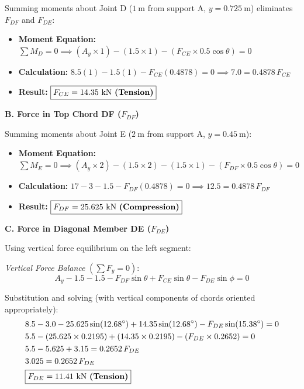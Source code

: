 \documentclass[12pt,a3paper]{article}
\begin{document}
\begin{enumerate}
\begin{tcolorbox}[enhanced,breakable,ansbox,colback=cE!4,colframe=cE,
  boxrule=0.8pt,arc=5pt,
  title={\textbf{Answer}},fonttitle=\bfseries\color{white},colbacktitle=cE]
Summing moments about Joint D ($1\ \text{m}$ from support A, $y = 0.725\ \text{m}$) eliminates $F_{DF}$ and $F_{DE}$:
\begin{itemize}[leftmargin=1.5em,itemsep=2pt]
  \item \textbf{Moment Equation:} 
    $\displaystyle\sum M_D = 0 \implies (A_y \times 1) - (1.5 \times 1) - (F_{CE} \times 0.5\cos\theta) = 0$
  \item \textbf{Calculation:} $8.5(1) - 1.5(1) - F_{CE}(0.4878) = 0 \implies 7.0 = 0.4878\, F_{CE}$
  \item \textbf{Result:} $\boxed{F_{CE} = 14.35\ \text{kN \textbf{(Tension)}}}$
\end{itemize}

\textbf{B. Force in Top Chord DF ($F_{DF}$)}

Summing moments about Joint E ($2\ \text{m}$ from support A, $y = 0.45\ \text{m}$):
\begin{itemize}[leftmargin=1.5em,itemsep=2pt]
  \item \textbf{Moment Equation:} 
    $\displaystyle\sum M_E = 0 \implies (A_y \times 2) - (1.5 \times 2) - (1.5 \times 1) - (F_{DF} \times 0.5\cos\theta) = 0$
  \item \textbf{Calculation:} $17 - 3 - 1.5 - F_{DF}(0.4878) = 0 \implies 12.5 = 0.4878\, F_{DF}$
  \item \textbf{Result:} $\boxed{F_{DF} = 25.625\ \text{kN \textbf{(Compression)}}}$
\end{itemize}

\textbf{C. Force in Diagonal Member DE ($F_{DE}$)}

Using vertical force equilibrium on the left segment:

\textit{Vertical Force Balance} $\left(\sum F_y = 0\right)$:
\[
  A_y - 1.5 - 1.5 - F_{DF}\sin\theta + F_{CE}\sin\theta - F_{DE}\sin\phi = 0
\]

Substitution and solving (with vertical components of chords oriented appropriately):
\begin{align*}
  &8.5 - 3.0 - 25.625\sin(12.68^\circ) + 14.35\sin(12.68^\circ) - F_{DE}\sin(15.38^\circ) = 0\\
  &5.5 - (25.625 \times 0.2195) + (14.35 \times 0.2195) - (F_{DE} \times 0.2652) = 0\\
  &5.5 - 5.625 + 3.15 = 0.2652\, F_{DE}\\
  &3.025 = 0.2652\, F_{DE}\\
  &\boxed{F_{DE} = 11.41\ \text{kN \textbf{(Tension)}}}
\end{align*}


\end{tcolorbox}
\end{enumerate}
\end{document}
